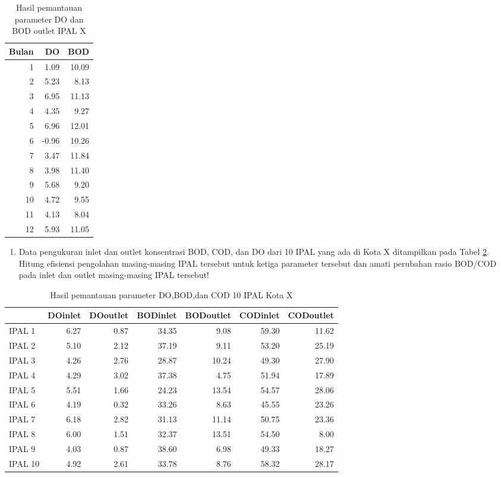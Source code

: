 \documentclass[12pt,]{krantz}
\providecommand{\tightlist}{%
  \setlength{\itemsep}{0pt}\setlength{\parskip}{0pt}}
\begin{document}
\begin{table}

\caption{\label{tab:soal1}Hasil pemantauan parameter DO dan BOD outlet IPAL X}
\centering
\begin{tabular}[t]{r|r|r}
\hline
Bulan & DO & BOD\\
\hline
1 & 1.09 & 10.09\\
\hline
2 & 5.23 & 8.13\\
\hline
3 & 6.95 & 11.13\\
\hline
4 & 4.35 & 9.27\\
\hline
5 & 6.96 & 12.01\\
\hline
6 & -0.96 & 10.26\\
\hline
7 & 3.47 & 11.84\\
\hline
8 & 3.98 & 11.40\\
\hline
9 & 5.68 & 9.20\\
\hline
10 & 4.72 & 9.55\\
\hline
11 & 4.13 & 8.04\\
\hline
12 & 5.93 & 11.05\\
\hline
\end{tabular}
\end{table}

\begin{enumerate}
\def\labelenumi{\arabic{enumi}.}
\setcounter{enumi}{1}
\tightlist
\item
  Data pengukuran inlet dan outlet konsentrasi BOD, COD, dan DO dari 10 IPAL yang ada di Kota X ditampilkan pada Tabel \ref{tab:soal2}. Hitung efisiensi pengolahan masing-masing IPAL tersebut untuk ketiga parameter tersebut dan amati perubahan rasio BOD/COD pada inlet dan outlet masing-masing IPAL tersebut!
\end{enumerate}

\begin{table}

\caption{\label{tab:soal2}Hasil pemantauan parameter DO,BOD,dan COD 10 IPAL Kota X}
\centering
\begin{tabular}[t]{l|r|r|r|r|r|r}
\hline
  & DOinlet & DOoutlet & BODinlet & BODoutlet & CODinlet & CODoutlet\\
\hline
IPAL 1 & 6.27 & 0.87 & 34.35 & 9.08 & 59.30 & 11.62\\
\hline
IPAL 2 & 5.10 & 2.12 & 37.19 & 9.11 & 53.20 & 25.19\\
\hline
IPAL 3 & 4.26 & 2.76 & 28.87 & 10.24 & 49.30 & 27.90\\
\hline
IPAL 4 & 4.29 & 3.02 & 37.38 & 4.75 & 51.94 & 17.89\\
\hline
IPAL 5 & 5.51 & 1.66 & 24.23 & 13.54 & 54.57 & 28.06\\
\hline
IPAL 6 & 4.19 & 0.32 & 33.26 & 8.63 & 45.55 & 23.26\\
\hline
IPAL 7 & 6.18 & 2.82 & 31.13 & 11.14 & 50.75 & 23.36\\
\hline
IPAL 8 & 6.00 & 1.51 & 32.37 & 13.51 & 54.50 & 8.00\\
\hline
IPAL 9 & 4.03 & 0.87 & 38.60 & 6.98 & 49.33 & 18.27\\
\hline
IPAL 10 & 4.92 & 2.61 & 33.78 & 8.76 & 58.32 & 28.17\\
\hline
\end{tabular}
\end{table}
\end{document}
